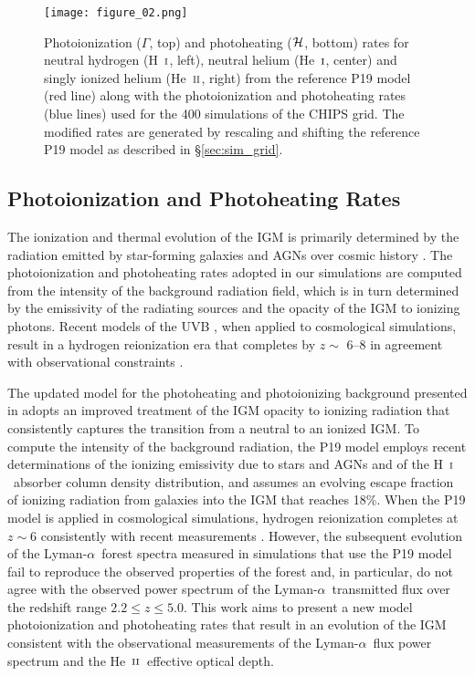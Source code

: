 \documentclass[twocolumn]{aastex62}
\newcommand\Lya{Lyman-$\alpha$}
\def\HI{\hbox{\rm H~$\scriptstyle\rm I$}}
\def\HeI{\hbox{He~$\scriptstyle\rm I$}}
\def\HeII{\hbox{He~$\scriptstyle\rm II$}}
\begin{document}
\begin{figure*}
\texttt{[image: figure\_02.png]}
\caption{Photoionization ($\Gamma$, top) and photoheating ($\cal{H}$, bottom) 
rates for neutral hydrogen (\HI, left), neutral
helium (\HeI, center) and singly ionized helium (\HeII, right) from the reference P19 model \citep{puchwein2019a} (red line) along with the 
photoionization and photoheating rates (blue lines) used for the 400 simulations of the CHIPS grid. The modified rates are generated by rescaling 
and shifting the reference P19 model as described in \S \ref{sec:sim_grid}.}    \label{fig:uvb_rates}
\end{figure*} 


\subsection{Photoionization and Photoheating Rates} \label{sec:uvb_rates}

The ionization and thermal evolution of the IGM is primarily determined by the radiation emitted by star-forming galaxies and AGNs over cosmic history 
\citep{mcquinn2016a, Upton-Sanderbeck+2016, onorbe2017a}. The photoionization and photoheating rates adopted in our simulations are computed from the intensity 
of the background radiation field, which is in turn determined by the emissivity of the radiating sources and the opacity of the IGM to ionizing photons. 
Recent models of the UVB \citep{puchwein2019a, khaire2019a, faucher-giguere2020a}, when applied to cosmological simulations, result in a hydrogen 
reionization era that completes by $z \sim$ 6--8 in agreement with observational constraints \citep{davies2018b, Planck_collaboration_2020}. 

The updated model for the photoheating and photoionizing background presented in \citet[][hereafter P19]{puchwein2019a} adopts an improved 
treatment of the IGM opacity to ionizing radiation that consistently captures the transition from a neutral to an ionized IGM. To compute the intensity of the 
background radiation, the P19 model employs recent determinations of the ionizing emissivity due to stars and AGNs and of the \HI\ absorber column density 
distribution, and assumes an evolving escape fraction of ionizing radiation from galaxies into the IGM that reaches 18\%. When the P19 model is applied 
in cosmological simulations, hydrogen reionization completes at $z \sim 6$ consistently with recent measurements 
\citep{Becker+2001, Bosman_2018, Becker+2021, Qin+2021}. However, the subsequent evolution of the \Lya\ forest 
spectra measured in simulations 
that use the P19 model fail to reproduce the observed properties of the forest \citep{villasenor2021a} and, in particular, do not agree with the observed power spectrum of the \Lya\ transmitted flux over the redshift range $2.2 \le z \le 5.0$. This work aims to present a new model photoionization 
and photoheating rates that result in an evolution of the IGM consistent with the observational measurements of the \Lya\ flux power spectrum and the 
\HeII\ effective optical depth.
\end{document}
